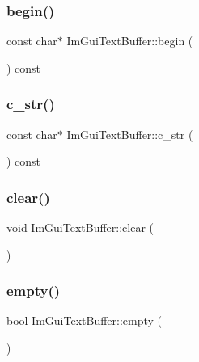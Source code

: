 \hypertarget{struct_im_gui_text_buffer_aab6d83c6b9a8061287a4cb6135c1cab4}{}\label{struct_im_gui_text_buffer_aab6d83c6b9a8061287a4cb6135c1cab4} 
\subsubsection{\texorpdfstring{begin()}{begin()}}
{\footnotesize\ttfamily const char$\ast$ Im\+Gui\+Text\+Buffer\+::begin (\begin{DoxyParamCaption}{ }\end{DoxyParamCaption}) const}

\hypertarget{struct_im_gui_text_buffer_afb03439bc91723e274bfb9d247a691b9}{}\label{struct_im_gui_text_buffer_afb03439bc91723e274bfb9d247a691b9} 
\subsubsection{\texorpdfstring{c\+\_\+str()}{c\_str()}}
{\footnotesize\ttfamily const char$\ast$ Im\+Gui\+Text\+Buffer\+::c\+\_\+str (\begin{DoxyParamCaption}{ }\end{DoxyParamCaption}) const}

\hypertarget{struct_im_gui_text_buffer_a9e4edc9f950bc9e35d5c3b3071dbc0df}{}\label{struct_im_gui_text_buffer_a9e4edc9f950bc9e35d5c3b3071dbc0df} 
\subsubsection{\texorpdfstring{clear()}{clear()}}
{\footnotesize\ttfamily void Im\+Gui\+Text\+Buffer\+::clear (\begin{DoxyParamCaption}{ }\end{DoxyParamCaption})}

\hypertarget{struct_im_gui_text_buffer_afdef38ae725bb5495f0143170fa902c8}{}\label{struct_im_gui_text_buffer_afdef38ae725bb5495f0143170fa902c8} 
\subsubsection{\texorpdfstring{empty()}{empty()}}
{\footnotesize\ttfamily bool Im\+Gui\+Text\+Buffer\+::empty (\begin{DoxyParamCaption}{ }\end{DoxyParamCaption})}

